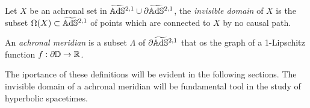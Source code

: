 \begin{definition}
    Let $X$ be an achronal set in $\widetilde{\mathbb{A}\mathrm{d}\mathbb{S}}{}^{2,1} \cup \partial\widetilde{\mathbb{A}\mathrm{d}\mathbb{S}}{}^{2,1}$, the \textit{invisible domain} of $X$ is the subset $\Omega(X) \subset \widetilde{\mathbb{A}\mathrm{d}\mathbb{S}}{}^{2,1}$ of points which are connected to $X$ by no causal path.
\end{definition}
\begin{definition}
    An \textit{achronal meridian} is a subset $\Lambda$ of $\partial\widetilde{\mathbb{A}\mathrm{d}\mathbb{S}}{}^{2,1}$ that os the graph of a 1-Lipschitz function $f: \partial\mathbb{D}\to\mathbb{R}$.
\end{definition}
The iportance of these definitions will be evident in the following sections.
The invisible domain of a achronal meridian will be fundamental tool in the study of hyperbolic spacetimes.
 


